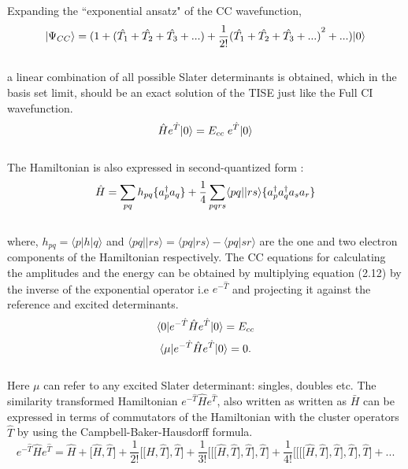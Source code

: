 Expanding the ``exponential ansatz" of the CC wavefunction,
\\
\begin{equation}
| \Psi_{CC} \rangle = (1+(\hat{T_1} + \hat{T_2} + \hat{T_3} + ... ) + \frac{1}{2!}{(\hat{T_1} + \hat{T_2} + \hat{T_3} + ...)}^2 + ... )| 0 \rangle
\end{equation}
\\
a linear combination of all possible Slater determinants is obtained, which in the basis set limit,  
should be an exact solution of the TISE just like the Full CI wavefunction. 
\\
\begin{equation}
\hat{H}e^{\hat{T}}| 0 \rangle = E_{cc}\;e^{\hat{T}}| 0 \rangle
\end{equation}
\\
The Hamiltonian is also expressed in second-quantized form \cite{Crawford00}:
\\
\begin{equation}
\hat{H} = \sum_{pq}h_{pq}\{a^\dagger_pa_q\} + \frac{1}{4}\sum_{pqrs}\langle pq || rs \rangle\{a^\dagger_pa^\dagger_qa_sa_r\}
\end{equation}
\\
where, $h_{pq} = \langle p|h|q \rangle$ and $\langle pq||rs \rangle = \langle pq|rs \rangle - \langle pq|sr \rangle$ are the one and two electron components of the Hamiltonian respectively.
The CC equations for calculating the amplitudes and the energy can be  
obtained by multiplying equation (2.12) by the inverse of the exponential operator i.e
$e^{-\hat{T}}$ and projecting it against the reference and excited
determinants.
\\
\begin {equation}
\langle 0 |e^{-\hat{T}}\hat{H}e^{\hat{T}}| 0 \rangle = E_{cc}
\end{equation}
\begin{equation}
\langle \mu |e^{-\hat{T}}\hat{H}e^{\hat{T}}| 0 \rangle = 0 .
\end{equation} 
\\
Here $\mu$ can refer to any excited Slater determinant: singles, doubles etc. 
The similarity transformed Hamiltonian $e^{-\hat{T}}\hat{H}e^{\hat{T}}$, also written as 
written as $\bar{H}$ can be expressed in terms of commutators of the Hamiltonian with the 
cluster operators $\hat{T}$ by using the Campbell-Baker-Hausdorff formula\cite{Merzbacher70}.
\\
\begin{equation}
e^{-\hat{T}}\hat{H}e^{\hat{T}} = \hat{H} + \lbrack\hat{H},\hat{T}\rbrack + \frac{1}{2!}\lbrack\lbrack\hat{H},\hat{T}\rbrack,\hat{T}\rbrack + \frac{1}{3!}\lbrack\lbrack\lbrack\hat{H},\hat{T}\rbrack,\hat{T}\rbrack,\hat{T}\rbrack + \frac{1}{4!}\lbrack\lbrack\lbrack\lbrack\hat{H},\hat{T}\rbrack,\hat{T}\rbrack,\hat{T}\rbrack,\hat{T}\rbrack + ...
\end{equation}
